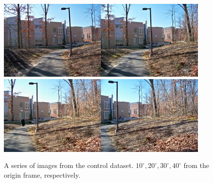 \documentclass[12pt]{amsart}
\begin{document}
\begin{figure}[htbp]
\begin{center}
\includegraphics[scale =.5]{rptImages/100_2992.jpg}\includegraphics[scale =.5]{rptImages/100_2993.jpg}\includegraphics[scale =.5]{rptImages/100_2994.jpg}\includegraphics[scale =.5]{rptImages/100_2995.jpg}
\caption{A series of images from the control dataset. $10^{\circ},20^{\circ},30^{\circ},40^{\circ}$ from the origin frame, respectively.}
\label{default}
\end{center}
\end{figure}
\end{document}
